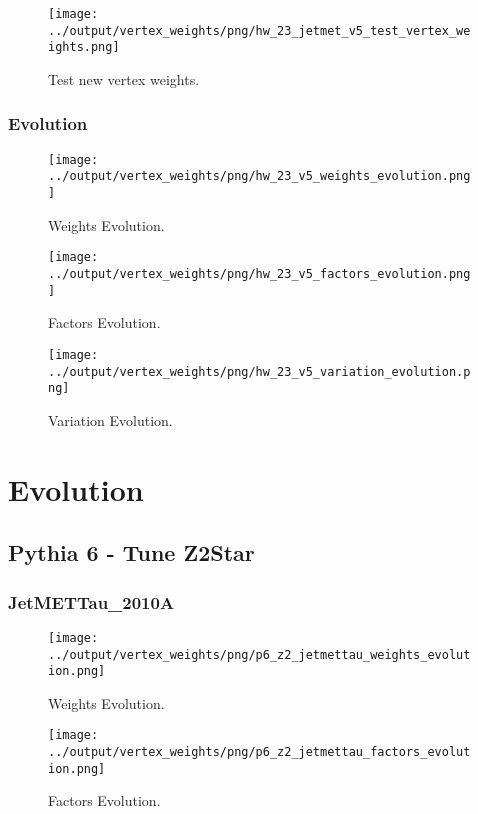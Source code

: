 \documentclass[11pt]{book}
\begin{document}
\begin{figure}[ht]
\centering
\texttt{[image: ../output/vertex\_weights/png/hw\_23\_jetmet\_v5\_test\_vertex\_weights.png]}
\caption{Test new vertex weights.}
\end{figure}
\clearpage

\subsection{Evolution}
\begin{figure}[ht]
\centering
\texttt{[image: ../output/vertex\_weights/png/hw\_23\_v5\_weights\_evolution.png]}
\caption{Weights Evolution.}
\end{figure}


\begin{figure}[ht]
\centering
\texttt{[image: ../output/vertex\_weights/png/hw\_23\_v5\_factors\_evolution.png]}
\caption{Factors Evolution.}
\end{figure}

\begin{figure}[ht]
\centering
\texttt{[image: ../output/vertex\_weights/png/hw\_23\_v5\_variation\_evolution.png]}
\caption{Variation Evolution.}
\end{figure}
\clearpage



\chapter{Evolution}


\section{Pythia 6 - Tune Z2Star}
\subsection{JetMETTau\_2010A}
\begin{figure}[ht]
\centering
\texttt{[image: ../output/vertex\_weights/png/p6\_z2\_jetmettau\_weights\_evolution.png]}
\caption{Weights Evolution.}
\end{figure}

\begin{figure}[ht]
\centering
\texttt{[image: ../output/vertex\_weights/png/p6\_z2\_jetmettau\_factors\_evolution.png]}
\caption{Factors Evolution.}
\end{figure}
\end{document}
